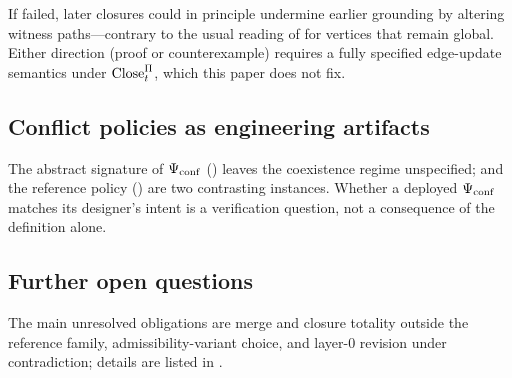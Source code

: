 \begin{remark}[Interpretation]
\label{rem:conj-matters}
If  failed, later closures could in principle undermine earlier grounding by altering witness paths---contrary to the usual reading of  for vertices that remain global.
Either direction (proof or counterexample) requires a fully specified edge-update semantics under $\mathrm{Close}_t^{\Pi}$, which this paper does not fix.
\end{remark}

\subsection{Conflict policies as engineering artifacts}
\label{sec:th-conflict}

\begin{remark}
\label{rem:psi-not-theorem}
The abstract signature of $\Psi_{\mathrm{conf}}$ () leaves the coexistence regime unspecified;  and the reference policy () are two contrasting instances.
Whether a deployed $\Psi_{\mathrm{conf}}$ matches its designer's intent is a verification question, not a consequence of the definition alone.
\end{remark}

\subsection{Further open questions}
\label{sec:th-open}

The main unresolved obligations are merge and closure totality outside the reference family, admissibility-variant choice, and layer-$0$ revision under contradiction; details are listed in .
